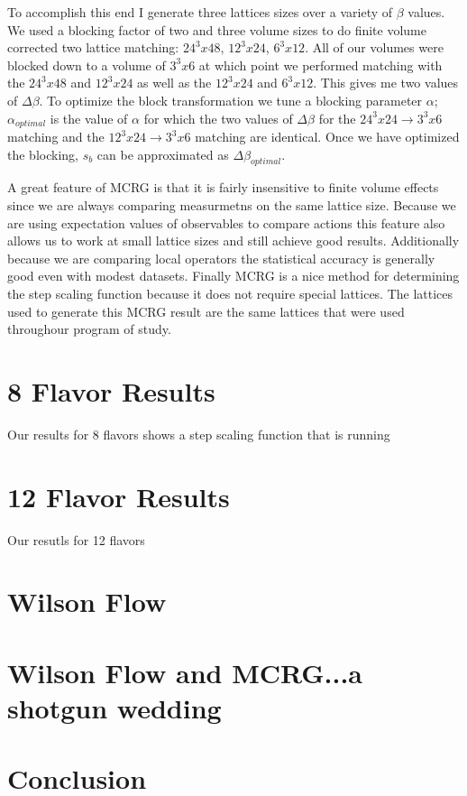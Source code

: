 \documentclass{PoS}
\begin{document}
To accomplish this end I generate three lattices sizes over a variety of $\beta$ values.  We used a blocking factor of two and three volume sizes to do finite volume corrected two lattice matching:  $24^3x48$, $12^3x24$, $6^3x12$.  All of our volumes were blocked down to a volume of $3^3x6$ at which point we performed matching with the $24^3x48$ and $12^3x24$ as well as the $12^3x24$ and $6^3x12$.  This gives me two values of $\Delta\beta$.  To optimize the block transformation we tune a blocking parameter $\alpha$; $\alpha_{optimal}$ is the value of $\alpha$ for which the two values of $\Delta\beta$ for the $24^3x24\to3^3x6$ matching and the $12^3x24\to3^3x6$ matching are identical.  Once we have optimized the blocking, $s_b$ can be approximated as $\Delta\beta_{optimal}$.

A great feature of MCRG is that it is fairly insensitive to finite volume effects since we are always comparing measurmetns on the same lattice size.  Because we are using expectation values of observables to compare actions this feature also allows us to work at small lattice sizes and still achieve good results.  Additionally because we are comparing local operators the statistical accuracy is generally good even with modest datasets.  Finally MCRG is a nice method for determining the step scaling function because it does not require special lattices.  The lattices used to generate this MCRG result are the same lattices that were used throughour program of study.


\section{8 Flavor Results}
Our results for 8 flavors shows a step scaling function that is running 

\section{12 Flavor Results}
Our resutls for 12 flavors 

\section{Wilson Flow}

\section{Wilson Flow and MCRG...a shotgun wedding}

\section{Conclusion}
\end{document}

